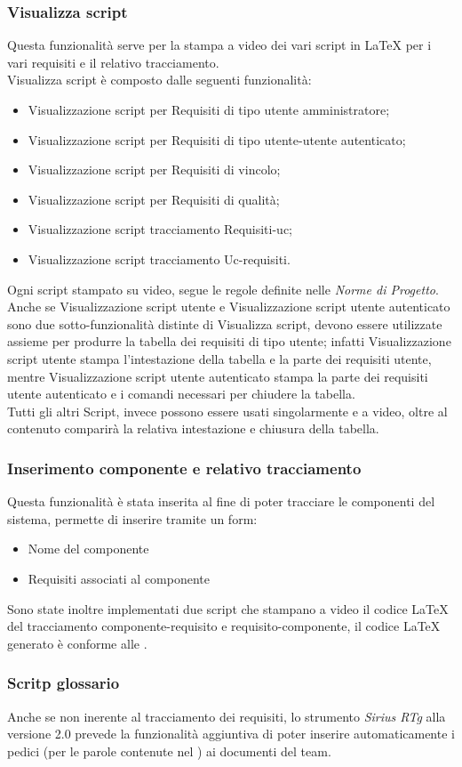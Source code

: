 \subsubsection{Visualizza script}
Questa funzionalità serve per la stampa a video dei vari script in \LaTeX{} per i vari requisiti e il relativo tracciamento.\\ Visualizza script è composto dalle seguenti funzionalità:
	\begin{itemize}
		\item Visualizzazione script per Requisiti di tipo utente amministratore;
		\item Visualizzazione script per Requisiti di tipo utente-utente autenticato;
		\item Visualizzazione script per Requisiti di vincolo;
		\item Visualizzazione script per Requisiti di qualità;
		\item Visualizzazione script tracciamento Requisiti-uc;
		\item Visualizzazione script tracciamento Uc-requisiti.
	\end{itemize}
Ogni script stampato su video, segue le regole definite nelle \textit{Norme di Progetto}.\\
Anche se Visualizzazione script utente e Visualizzazione script utente autenticato sono due sotto-funzionalità distinte di Visualizza script, devono essere utilizzate assieme per produrre la tabella dei requisiti di tipo utente; infatti Visualizzazione script utente stampa l'intestazione della tabella e la parte dei requisiti utente, mentre Visualizzazione script utente autenticato stampa la parte dei requisiti utente autenticato e i comandi necessari per chiudere la tabella.\\
Tutti gli altri Script, invece possono essere usati singolarmente e a video, oltre al contenuto comparirà la relativa intestazione e chiusura della tabella.
\subsubsection{Inserimento componente e relativo tracciamento}
Questa funzionalità è stata inserita al fine di poter tracciare le componenti del sistema, permette di inserire tramite un form:
\begin{itemize}
\item Nome del componente
\item Requisiti associati al componente
\end{itemize}
Sono state inoltre implementati due script che stampano a video il codice \LaTeX{} del tracciamento componente-requisito e requisito-componente, il codice \LaTeX{} generato è conforme alle \NormeDiProgetto{}.
\subsubsection{Scritp glossario}
Anche se non inerente al tracciamento dei requisiti, lo strumento \textit{Sirius RTg} alla versione 2.0 prevede la funzionalità aggiuntiva di poter inserire automaticamente i pedici  (per le parole contenute nel \Glossario{}) ai documenti del team.